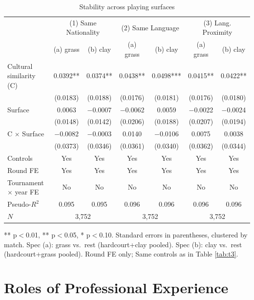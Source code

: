 \documentclass[10pt]{article}
\begin{document}
\begin{table}[htbp]
\color{blue}
\centering
\caption{Stability across playing surfaces \label{tab:t5}}
\begin{threeparttable}
\begin{tabular}{lcccccc}
\toprule
 & \multicolumn{2}{c}{(1) Same Nationality} & \multicolumn{2}{c}{(2) Same Language} & \multicolumn{2}{c}{(3) Lang. Proximity} \\
 & (a) grass & (b) clay & (a) grass & (b) clay & (a) grass & (b) clay \\
\midrule
Cultural similarity (C) & 0.0392** & 0.0374** & 0.0438** & 0.0498*** & 0.0415** & 0.0422** \\
 & (0.0183) & (0.0188) & (0.0176) & (0.0181) & (0.0176) & (0.0180) \\
Surface & 0.0063 & $-$0.0007 & $-$0.0062 & 0.0059 & $-$0.0022 & $-$0.0024 \\
 & (0.0148) & (0.0142) & (0.0206) & (0.0188) & (0.0207) & (0.0194) \\
C $\times$ Surface & $-$0.0082 & $-$0.0003 & 0.0140 & $-$0.0106 & 0.0075 & 0.0038 \\
 & (0.0373) & (0.0346) & (0.0361) & (0.0340) & (0.0362) & (0.0344) \\
\midrule
Controls  & Yes & Yes & Yes & Yes & Yes & Yes \\
Round FE & Yes & Yes & Yes & Yes & Yes & Yes \\
Tournament $\times$ year FE & No & No & No & No & No & No \\
Pseudo-$R^2$ & 0.095 & 0.095 & 0.096 & 0.096 & 0.096 & 0.096 \\
$N$ & \multicolumn{2}{c}{3,752} & \multicolumn{2}{c}{3,752} & \multicolumn{2}{c}{3,752} \\
\bottomrule
\end{tabular}
\begin{tablenotes}
\small
\item *** p$<$0.01, ** p$<$0.05, * p$<$0.10. Standard errors in parentheses, clustered by match. Spec (a): grass vs.\ rest (hardcourt+clay pooled). Spec (b): clay vs.\ rest (hardcourt+grass pooled). Round FE only; Same controls as in  Table \ref{tab:t3}. 
\end{tablenotes}
\end{threeparttable}
\end{table}
\FloatBarrier


\section{Roles of Professional Experience}
\end{document}
